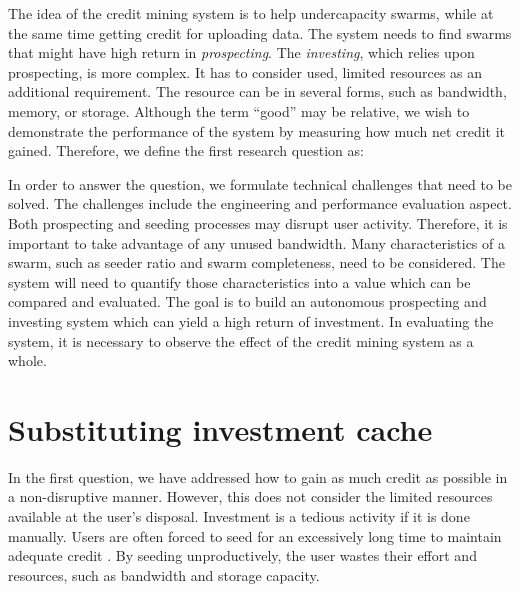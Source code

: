 The idea of the credit mining system is to help undercapacity swarms, while at the same time getting credit for uploading data. The system needs to find swarms that might have high return in \textit{prospecting}. The \textit{investing}, which relies upon prospecting, is more complex. It has to consider used, limited resources as an additional requirement. The resource can be in several forms, such as bandwidth, memory, or storage. Although the term ``good'' may be relative, we wish to demonstrate the performance of the system by measuring how much net credit it gained. Therefore, we define the first research question as:

	
In order to answer the question, we formulate technical challenges that need to be solved. The challenges include the engineering and performance evaluation aspect. Both prospecting and seeding processes may disrupt user activity. Therefore, it is important to take advantage of any unused bandwidth. Many characteristics of a swarm, such as seeder ratio and swarm completeness, need to be considered. The system will need to quantify those characteristics into a value which can be compared and evaluated. The goal is to build an autonomous prospecting and investing system which can yield a high return of investment. In evaluating the system, it is necessary to observe the effect of the credit mining system as a whole.

\section{Substituting investment cache}
In the first question, we have addressed how to gain as much credit as possible in a non-disruptive manner. However, this does not consider the limited resources available at the user's disposal. Investment is a tedious activity if it is done manually. Users are often forced to seed for an excessively long time to maintain adequate credit \cite{2013:survivepriv:jia}. By seeding unproductively, the user wastes their effort and resources, such as bandwidth and storage capacity. 

